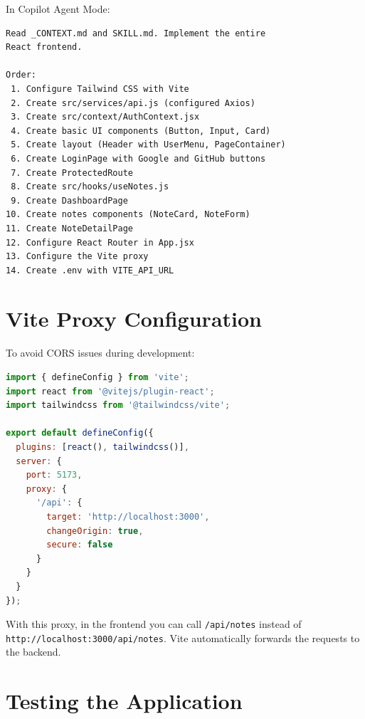 \begin{praticabox}[title={Hands-On --- Generate the application}]
In Copilot Agent Mode:
\begin{lstlisting}[language={}]
Read _CONTEXT.md and SKILL.md. Implement the entire
React frontend.

Order:
 1. Configure Tailwind CSS with Vite
 2. Create src/services/api.js (configured Axios)
 3. Create src/context/AuthContext.jsx
 4. Create basic UI components (Button, Input, Card)
 5. Create layout (Header with UserMenu, PageContainer)
 6. Create LoginPage with Google and GitHub buttons
 7. Create ProtectedRoute
 8. Create src/hooks/useNotes.js
 9. Create DashboardPage
10. Create notes components (NoteCard, NoteForm)
11. Create NoteDetailPage
12. Configure React Router in App.jsx
13. Configure the Vite proxy
14. Create .env with VITE_API_URL
\end{lstlisting}
\end{praticabox}

\section{Vite Proxy Configuration}

To avoid CORS issues during development:

\begin{lstlisting}[language=JavaScript,title={\texttt{vite.config.js}}]
import { defineConfig } from 'vite';
import react from '@vitejs/plugin-react';
import tailwindcss from '@tailwindcss/vite';

export default defineConfig({
  plugins: [react(), tailwindcss()],
  server: {
    port: 5173,
    proxy: {
      '/api': {
        target: 'http://localhost:3000',
        changeOrigin: true,
        secure: false
      }
    }
  }
});
\end{lstlisting}

\begin{tipbox}
With this proxy, in the frontend you can call \texttt{/api/notes} instead of \texttt{http://localhost:3000/api/notes}. Vite automatically forwards the requests to the backend.
\end{tipbox}

\section{Testing the Application}

